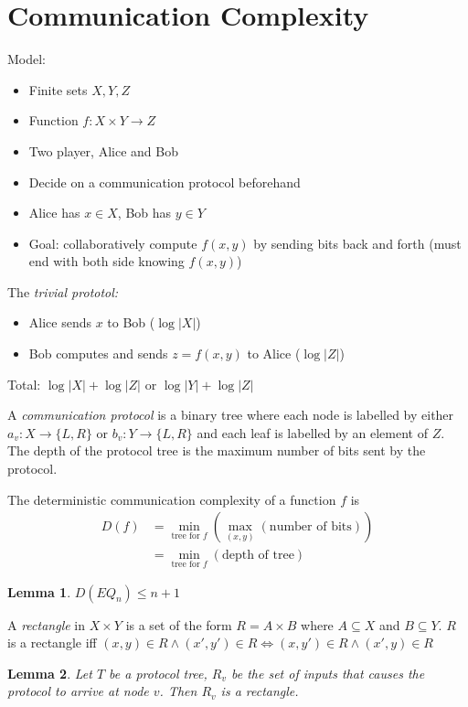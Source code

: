 \documentclass[letterpaper,landscape,11pt]{article}
\newtheorem{lemma}{Lemma}
\begin{document}
\section{Communication Complexity}
Model:
\begin{itemize}
	\item Finite sets $X, Y, Z$
	\item Function $f : X \times Y \rightarrow Z$
	\item Two player, Alice and Bob
	\item Decide on a communication protocol beforehand
	\item Alice has $x \in X$, Bob has $y \in Y$
	\item Goal: collaboratively compute $f(x, y)$ by sending bits back and forth (must end with both side knowing $f(x, y)$)
\end{itemize}

\noindent The \emph{trivial prototol:}
\begin{itemize}
	\item Alice sends $x$ to Bob ($\log |X|$)
	\item Bob computes and sends $z = f(x, y)$ to Alice ($\log |Z|$)
\end{itemize}
Total: $\log |X| + \log |Z|$ or $\log |Y| + \log |Z|$

A \emph{communication protocol} is a binary tree where each node is labelled by either $a_v : X \rightarrow \{L, R\}$ or $b_v : Y \rightarrow \{L, R\}$ and each leaf is labelled by an element of $Z$. The depth of the protocol tree is the maximum number of bits sent by the protocol.

The deterministic communication complexity of a function $f$ is
\begin{align*}
	D(f) & = \min\limits_{\text{tree for } f} \left(\max\limits_{(x, y)}(\text{number of bits}) \right) \\
	& = \min\limits_{\text{tree for } f} (\text{depth of tree})
\end{align*}

\begin{lemma}
	$D(EQ_n) \leq n + 1$
\end{lemma}

A \emph{rectangle} in $X \times Y$ is a set of the form $R = A \times B$ where $A \subseteq X$ and $B \subseteq Y$. $R$ is a rectangle iff $(x, y) \in R \land (x', y') \in R \Leftrightarrow (x, y') \in R \land (x', y) \in R$

\begin{lemma}
	Let $T$ be a protocol tree, $R_v$ be the set of inputs that causes the protocol to arrive at node $v$. Then $R_v$ is a rectangle.
\end{lemma}
\end{document}
